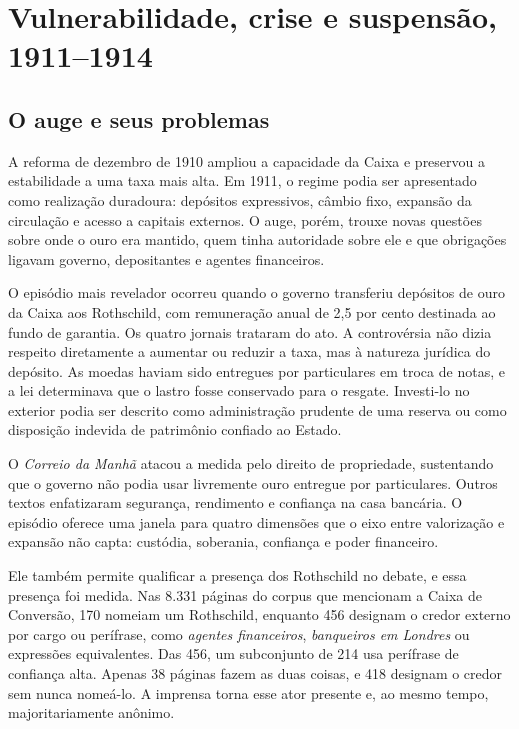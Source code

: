 \chapter{Vulnerabilidade, crise e suspensão, 1911--1914}

\section{O auge e seus problemas}

A reforma de dezembro de 1910 ampliou a capacidade da Caixa e preservou a estabilidade a uma taxa mais alta. Em 1911, o regime podia ser apresentado como realização duradoura: depósitos expressivos, câmbio fixo, expansão da circulação e acesso a capitais externos. O auge, porém, trouxe novas questões sobre onde o ouro era mantido, quem tinha autoridade sobre ele e que obrigações ligavam governo, depositantes e agentes financeiros.

O episódio mais revelador ocorreu quando o governo transferiu depósitos de ouro da Caixa aos Rothschild, com remuneração anual de 2,5 por cento destinada ao fundo de garantia. Os quatro jornais trataram do ato. A controvérsia não dizia respeito diretamente a aumentar ou reduzir a taxa, mas à natureza jurídica do depósito. As moedas haviam sido entregues por particulares em troca de notas, e a lei determinava que o lastro fosse conservado para o resgate. Investi-lo no exterior podia ser descrito como administração prudente de uma reserva ou como disposição indevida de patrimônio confiado ao Estado.


O \textit{Correio da Manhã} atacou a medida pelo direito de propriedade, sustentando que o governo não podia usar livremente ouro entregue por particulares. Outros textos enfatizaram segurança, rendimento e confiança na casa bancária. O episódio oferece uma janela para quatro dimensões que o eixo entre valorização e expansão não capta: custódia, soberania, confiança e poder financeiro.

Ele também permite qualificar a presença dos Rothschild no debate, e essa presença foi medida. Nas 8.331 páginas do corpus que mencionam a Caixa de Conversão, 170 nomeiam um Rothschild, enquanto 456 designam o credor externo por cargo ou perífrase, como \textit{agentes financeiros}, \textit{banqueiros em Londres} ou expressões equivalentes. Das 456, um subconjunto de 214 usa perífrase de confiança alta. Apenas 38 páginas fazem as duas coisas, e 418 designam o credor sem nunca nomeá-lo. A imprensa torna esse ator presente e, ao mesmo tempo, majoritariamente anônimo.

